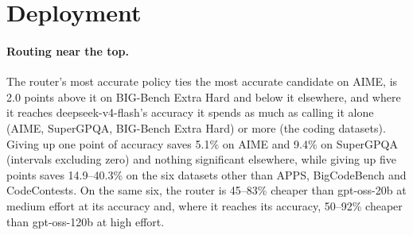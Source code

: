 \documentclass[10pt]{article}
\begin{document}
\begin{table}[t]
\centering
\footnotesize
\setlength{\tabcolsep}{3pt}
\caption{\textbf{Other scouts.} Each scout's activations feed both probes, refitted with the paper's recipes (Omni-MATH and MMLU-Pro, billed costs). $R^2$: test log-length $R^2$, mean over candidates. vs.\ median: cost saved (\%) relative to median pricing with the row's own success predictions. Ours vs.\ it: cost saved by our router relative to the row's, with 95\% intervals (bold: excludes zero) and the number of training sets in which ours is significantly ahead; ours is significantly behind in one training set only (Phi-4-mini, MMLU-Pro).}
\label{tab:size}
\end{table}


\FloatBarrier
\section{Deployment}\label{app:deploy}
\paragraph{Routing near the top.}
The router's most accurate policy ties the most accurate candidate on AIME, is 2.0 points above it on BIG-Bench Extra Hard and below it elsewhere, and where it reaches deepseek-v4-flash's accuracy it spends as much as calling it alone (AIME, SuperGPQA, BIG-Bench Extra Hard) or more (the coding datasets). Giving up one point of accuracy saves 5.1\% on AIME and 9.4\% on SuperGPQA (intervals excluding zero) and nothing significant elsewhere, while giving up five points saves 14.9--40.3\% on the six datasets other than APPS, BigCodeBench and CodeContests. On the same six, the router is 45--83\% cheaper than gpt-oss-20b at medium effort at its accuracy and, where it reaches its accuracy, 50--92\% cheaper than gpt-oss-120b at high effort.
\end{document}
